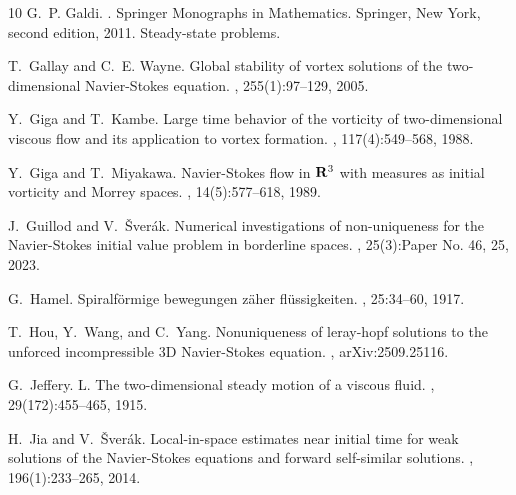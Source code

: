 \documentclass[12pt]{amsart}
\numberwithin{equation}{section}              %
\theoremstyle{remark}
\begin{document}
\begin{thebibliography}{10}
      	G.~P. Galdi.
      	.
      	\newblock Springer Monographs in Mathematics. Springer, New York, second
      	edition, 2011.
      	\newblock Steady-state problems.
      	
      	T.~Gallay and C.~E. Wayne.
      	\newblock Global stability of vortex solutions of the two-dimensional
      	{N}avier-{S}tokes equation.
      	, 255(1):97--129, 2005.
      	
      	Y.~Giga and T.~Kambe.
      	\newblock Large time behavior of the vorticity of two-dimensional viscous flow
      	and its application to vortex formation.
      	, 117(4):549--568, 1988.
      	
      	Y.~Giga and T.~Miyakawa.
      	\newblock Navier-{S}tokes flow in {$\bold R^3$} with measures as initial
      	vorticity and {M}orrey spaces.
      	, 14(5):577--618, 1989.
      	
      	J.~Guillod and V.~{\v{S}}ver{\'{a}}k.
      	\newblock Numerical investigations of non-uniqueness for the {N}avier-{S}tokes
      	initial value problem in borderline spaces.
      	, 25(3):Paper No. 46, 25, 2023.
      	
      	G.~Hamel.
      	\newblock Spiralf{\"o}rmige bewegungen z{\"a}her fl{\"u}ssigkeiten.
      	,
      	25:34--60, 1917.
      	
      	T.~Hou, Y.~Wang, and C.~Yang.
      	\newblock Nonuniqueness of leray-hopf solutions to the unforced incompressible
      	3{D} {N}avier-{S}tokes equation.
      	, arXiv:2509.25116.
      	
      	G.~Jeffery.
      	\newblock L. {T}he two-dimensional steady motion of a viscous fluid.
      	, 29(172):455--465, 1915.
      	
      	H.~Jia and V.~\v{S}ver\'{a}k.
      	\newblock Local-in-space estimates near initial time for weak solutions of the
      	{N}avier-{S}tokes equations and forward self-similar solutions.
      	, 196(1):233--265, 2014.
      	

\end{thebibliography}
\end{document}
